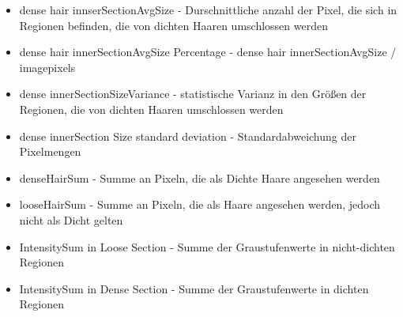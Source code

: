 \documentclass[german,a4paper, 12pt]{llncs}
\begin{document}
\begin{itemize}
	\item dense hair innserSectionAvgSize - Durschnittliche anzahl der Pixel, die sich in Regionen befinden, die von dichten Haaren umschlossen werden
	\item dense hair innerSectionAvgSize Percentage - dense hair innerSectionAvgSize / imagepixels
	\item dense innerSectionSizeVariance - statistische Varianz in den Größen der Regionen, die von dichten Haaren umschlossen werden
	\item dense innerSection Size standard deviation - Standardabweichung der Pixelmengen
	\item denseHairSum - Summe an Pixeln, die als Dichte Haare angesehen werden
	\item looseHairSum - Summe an Pixeln, die als Haare angesehen werden, jedoch nicht als Dicht gelten
	\item IntensitySum in Loose Section - Summe der Graustufenwerte in nicht-dichten Regionen
	\item IntensitySum in Dense Section - Summe der Graustufenwerte in dichten Regionen
\end{itemize}
\end{document}
